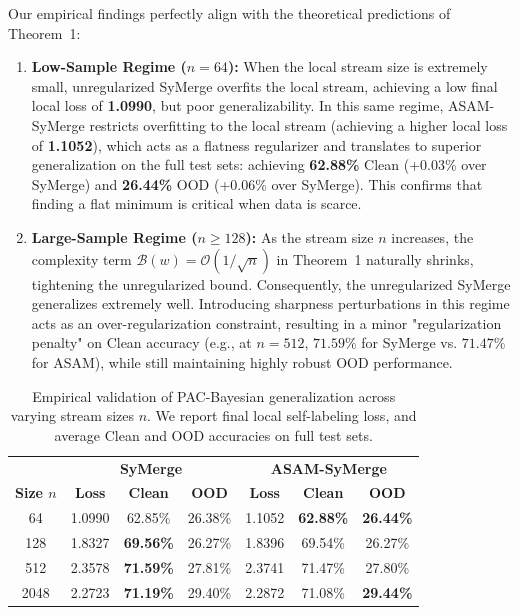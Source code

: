 \documentclass{article}
\begin{document}
Our empirical findings perfectly align with the theoretical predictions of Theorem~1:
\begin{enumerate}
    \item \textbf{Low-Sample Regime ($n=64$):} When the local stream size is extremely small, unregularized SyMerge overfits the local stream, achieving a low final local loss of \textbf{1.0990}, but poor generalizability. In this same regime, ASAM-SyMerge restricts overfitting to the local stream (achieving a higher local loss of \textbf{1.1052}), which acts as a flatness regularizer and translates to superior generalization on the full test sets: achieving \textbf{62.88\%} Clean (+0.03\% over SyMerge) and \textbf{26.44\%} OOD (+0.06\% over SyMerge). This confirms that finding a flat minimum is critical when data is scarce.
    \item \textbf{Large-Sample Regime ($n \ge 128$):} As the stream size $n$ increases, the complexity term $\mathcal{B}(w) = \mathcal{O}(1/\sqrt{n})$ in Theorem~1 naturally shrinks, tightening the unregularized bound. Consequently, the unregularized SyMerge generalizes extremely well. Introducing sharpness perturbations in this regime acts as an over-regularization constraint, resulting in a minor "regularization penalty" on Clean accuracy (e.g., at $n=512$, $71.59\%$ for SyMerge vs. $71.47\%$ for ASAM), while still maintaining highly robust OOD performance.
\end{enumerate}

\begin{table}[h]
\centering
\caption{Empirical validation of PAC-Bayesian generalization across varying stream sizes $n$. We report final local self-labeling loss, and average Clean and OOD accuracies on full test sets.}
\label{tab:streamsize}
\vspace{0.1in}
\footnotesize
\setlength{\tabcolsep}{1.8pt}
\begin{tabular}{c|ccc|ccc}
\toprule
& \multicolumn{3}{c|}{\textbf{SyMerge}} & \multicolumn{3}{c}{\textbf{ASAM-SyMerge}} \\
\textbf{Size $n$} & \textbf{Loss} & \textbf{Clean} & \textbf{OOD} & \textbf{Loss} & \textbf{Clean} & \textbf{OOD} \\
\midrule
64 & 1.0990 & 62.85\% & 26.38\% & 1.1052 & \textbf{62.88\%} & \textbf{26.44\%} \\
128 & 1.8327 & \textbf{69.56\%} & 26.27\% & 1.8396 & 69.54\% & 26.27\% \\
512 & 2.3578 & \textbf{71.59\%} & 27.81\% & 2.3741 & 71.47\% & 27.80\% \\
2048 & 2.2723 & \textbf{71.19\%} & 29.40\% & 2.2872 & 71.08\% & \textbf{29.44\%} \\
\bottomrule
\end{tabular}
\end{table}
\end{document}
